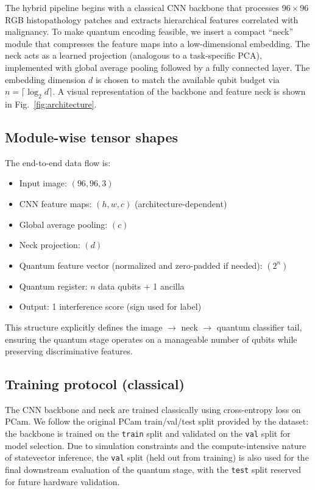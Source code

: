 \documentclass[conference]{IEEEtran}
\begin{document}
The hybrid pipeline begins with a classical CNN backbone that processes 96\,$\times$\,96 RGB histopathology patches and extracts hierarchical features correlated with malignancy. To make quantum encoding feasible, we insert a compact ``neck'' module that compresses the feature maps into a low-dimensional embedding. The neck acts as a learned projection (analogous to a task-specific PCA), implemented with global average pooling followed by a fully connected layer. The embedding dimension $d$ is chosen to match the available qubit budget via $n = \lceil \log_2 d \rceil$. A visual representation of the backbone and feature neck is shown in Fig.~\ref{fig:architecture}.

\subsection{Module-wise tensor shapes}
The end-to-end data flow is:
\begin{itemize}
    \item Input image: $(96, 96, 3)$
    \item CNN feature maps: $(h, w, c)$ (architecture-dependent)
    \item Global average pooling: $(c)$
    \item Neck projection: $(d)$
    \item Quantum feature vector (normalized and zero-padded if needed): $(2^n)$
    \item Quantum register: $n$ data qubits + 1 ancilla
    \item Output: 1 interference score (sign used for label)
\end{itemize}

This structure explicitly defines the image \(\rightarrow\) neck \(\rightarrow\) quantum classifier tail, ensuring the quantum stage operates on a manageable number of qubits while preserving discriminative features.

\subsection{Training protocol (classical)}
The CNN backbone and neck are trained classically using cross-entropy loss on PCam. We follow the original PCam train/val/test split provided by the dataset: the backbone is trained on the \texttt{train} split and validated on the \texttt{val} split for model selection. Due to simulation constraints and the compute-intensive nature of statevector inference, the \texttt{val} split (held out from training) is also used for the final downstream evaluation of the quantum stage, with the \texttt{test} split reserved for future hardware validation.
\end{document}
